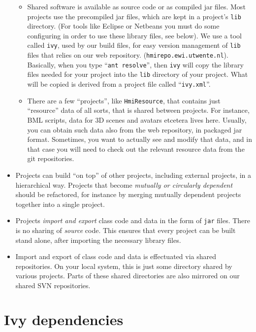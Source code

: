 \begin{itemize}
\begin{itemize}
\item Shared software is available as source code or as compiled jar files. Most projects use the precompiled
jar files, which are kept in a project's \verb#lib# directory. (For tools like Eclipse or Netbeans you must do some configuring
in order to use these library files, see below).
We use a tool called \verb#ivy#, used by our build files, for easy version management of \verb#lib# files 
that relies on our web  repository. (\verb#hmirepo.ewi.utwente.nl#).
Basically, when you type ``\verb#ant resolve#'', then \verb#ivy# will copy the library files
    needed for your project into the \verb#lib# directory of your project.  What will be copied is derived from
    a project file called ``\verb#ivy.xml#''. 
\item There are a few ``projects'', like \verb#HmiResource#, that contains just ``resource'' data of all sorts, that is shared
between projects. For instance, BML scripts, data for 3D scenes and avatars etcetera lives here.
Usually, you can obtain such data also from the web repository, in packaged jar format. Sometimes, you want
to actually see and modify that data, and in that case you will need to check out the relevant resource data
from the git repositories. 

\end{itemize}


\item Projects can build ``on top'' of other projects, including external projects, in a hierarchical way.
Projects that become \emph{mutually or circularly dependent} should be refactored, for instance by merging
 mutually dependent projects together into a single project.

\item Projects \emph{import and export} class code and data in the form of \verb"jar" files. There is
no sharing of \emph{source} code. This ensures that every project can be built stand alone, after importing
the necessary library files.

\item Import and export of class code and data is effectuated via shared repositories.
On your local system, this is just some directory shared by various projects.
Parts of these shared directories are also mirrored on our shared SVN repositories.


\end{itemize}



\section{Ivy dependencies}


